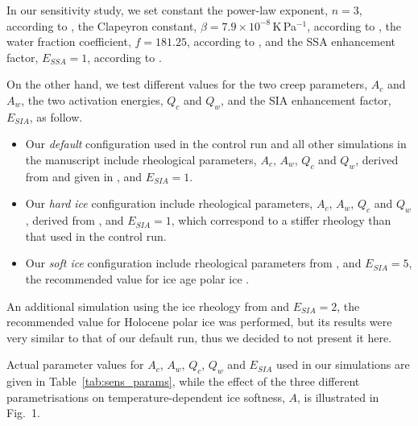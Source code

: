 In our sensitivity study, we set constant the power-law exponent, $n=3$,
according to \citet[p.~55--57]{Cuffey.Paterson.2010}, the Clapeyron constant,
$\beta=7.9\times 10^{-8}$\,K\,Pa$^{-1}$, according to \citep{Luthi.etal.2002},
the water fraction coefficient, $f=181.25$, according to
\citet{Lliboutry.Duval.1985}, and the SSA enhancement factor, $E_{SSA}=1$,
according to \citet[p.~77]{Cuffey.Paterson.2010}.

On the other hand, we test different values for the two creep parameters, $A_c$
and $A_w$, the two activation energies, $Q_c$ and $Q_w$, and the SIA
enhancement factor, $E_{SIA}$, as follow.

\begin{itemize}
    \item{Our \emph{default} configuration used in the control run and all other
          simulations in the manuscript include rheological parameters, $A_c$,
          $A_w$, $Q_c$ and $Q_w$, derived from \citet{Paterson.Budd.1982} and
          given in \citet[Eqn.~5]{Bueler.Brown.2009}, and $E_{SIA}=1$.}
    \item{Our \emph{hard ice} configuration include rheological parameters,
          $A_c$, $A_w$, $Q_c$ and $Q_w$, derived from
          \citet[p.~72 and 76]{Cuffey.Paterson.2010}, and $E_{SIA}=1$, which
          correspond to a stiffer rheology than that used in the control run.}
    \item{Our \emph{soft ice} configuration include rheological parameters
          from \citet{Cuffey.Paterson.2010}, and $E_{SIA}=5$, the
          recommended value for ice age polar ice
          \citep[p.~77]{Cuffey.Paterson.2010}.}
\end{itemize}

An additional simulation using the ice rheology from
\citet{Cuffey.Paterson.2010} and $E_{SIA}=2$, the
recommended value for Holocene polar ice \citep[p.~77]{Cuffey.Paterson.2010}
was performed, but its results were very similar to that of our default run,
thus we decided to not present it here.

Actual parameter values for $A_c$, $A_w$, $Q_c$, $Q_w$ and $E_{SIA}$ used in
our simulations are given in Table~\ref{tab:sens_params}, while the effect of
the three different parametrisations on temperature-dependent ice softness,
$A$, is illustrated in Fig.~1.


